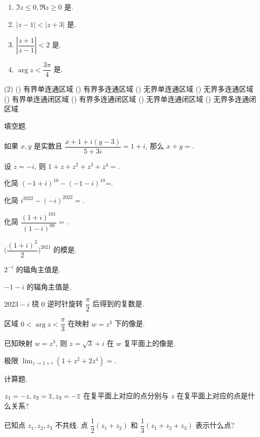 \begin{homework}
\begin{exlist}
\begin{enumerate}
        \item $\Im z\le0,\Re z\ge0$ 是\fillbrace{}.
        \item $|z-1|<|z+3|$ 是\fillbrace{}.
        \item $\left|\dfrac{z+1}{z-1}\right|<2$ 是\fillbrace{}.
        \item $\arg z<\dfrac{3\pi}4$ 是\fillbrace{}.
      \end{enumerate}
        \begin{taskschoice}(2)
          () 有界单连通区域
          () 有界多连通区域
          () 无界单连通区域
          () 无界多连通区域
          () 有界单连通闭区域
          () 有界多连通闭区域
          () 无界单连通闭区域
          () 无界多连通闭区域
        \end{taskschoice}
    \end{exlist}
  \item 填空题.
    \begin{exlist}
      \item 如果 $x,y$ 是实数且 $\dfrac{x+1+i(y-3)}{5+3i}=1+i$, 那么 $x+y=$\fillblank{}.
      \item 设 $z=-i$, 则 $1+z+z^2+z^3+z^4=$\fillblank{}.
      \item 化简 $(-1+i)^{10}-(-1-i)^{10}$=\fillblank{}.
      \item 化简 $i^{2022}-(-i)^{2022}=$\fillblank{}.
      \item 化简 $\dfrac{(1+i)^{101}}{(1-i)^{99}}=$\fillblank{}.
      \item $\biggl(\dfrac{(1+i)^2}2\biggr)^{2021}$ 的模是\fillblank{}.
      \item $2^{-i}$ 的辐角主值是\fillblank{}.
      \item $-1-i$ 的辐角主值是\fillblank{}.
      \item $2023-i$ 绕 $0$ 逆时针旋转 $\dfrac\pi2$ 后得到的复数是\fillblank{}.
      \item 区域 $0<\arg z<\dfrac\pi3$ 在映射 $w=z^3$ 下的像是\fillblank[12em]{}.
      \item 已知映射 $w=z^3$, 则 $z=\sqrt3+i$ 在 $w$ 复平面上的像是\fillblank{}.
      \item 极限 $\displaystyle\lim_{z\to1+i}(1+z^2+2z^4)=$\fillblank{}.
    \end{exlist}
  \item 计算题.
    \begin{exlist}
      \item $z_1=-z,z_2=\overline z,z_3=-\overline{z}$ 在复平面上对应的点分别与 $z$ 在复平面上对应的点是什么关系?
      \item 已知点 $z_1,z_2,z_3$ 不共线. 点 $\dfrac12(z_1+z_2)$ 和 $\dfrac13(z_1+z_2+z_3)$ 表示什么点?

\end{exlist}
\end{homework}
